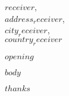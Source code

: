 \documentclass[a4paper, 12pt]{letter}
\begin{document}
\begin{letter}
{
    $receiver$,\\
    $address_receiver$,\\
    $city_receiver$,\\
    $country_receiver$
}

\opening{$opening$}


$body$

\closing{$thanks$}

\end{letter}
\end{document}
